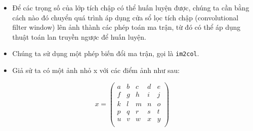 \documentclass{book}
\begin{document}
\begin{itemize}
    \item Để các trọng số của lớp tích chập có thể huấn luyện được, chúng ta cần bằng cách nào đó chuyển quá trình áp dụng cửa sổ lọc tích chập (convolutional filter window) lên ảnh thành các phép toán ma trận, từ đó có thể áp dụng thuật toán lan truyền ngược để huấn luyện.
    \item Chúng ta sử dụng một phép biến đổi ma trận, gọi là \texttt{im2col}.
    \item Giả sử ta có một ảnh nhỏ x với các điểm ảnh như sau:

    \[
    x = 
    \begin{pmatrix}
    a & b & c & d & e \\
    f & g & h & i & j \\
    k & l & m & n & o \\
    p & q & r & s & t \\
    u & v & w & x & y \\
    \end{pmatrix}
    \]


\end{itemize}
\end{document}
